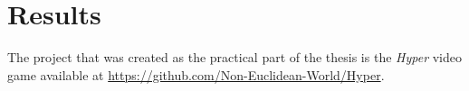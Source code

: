 \chapter{Results}
The project that was created as the practical part of the thesis is the \textit{Hyper} video game available at \url{https://github.com/Non-Euclidean-World/Hyper}.



